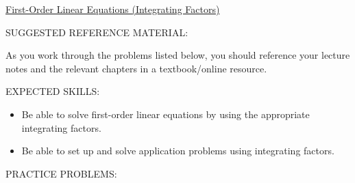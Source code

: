 \documentclass[12pt]{article}
\begin{document}
\begin{center}
\underline{\LARGE{First-Order Linear Equations (Integrating Factors)}}
\end{center}

\noindent SUGGESTED REFERENCE MATERIAL:

\medskip

\noindent As you work through the problems listed below, you should reference your lecture 
notes and the relevant chapters in a textbook/online resource.

\bigskip

\noindent EXPECTED SKILLS:

\medskip

\begin{itemize}[topsep=0pt]

\item Be able to solve first-order linear equations by using the appropriate integrating factors.

\item Be able to set up and solve application problems using integrating factors. 

\end{itemize}

\bigskip

\noindent PRACTICE PROBLEMS:

\medskip


\medskip
\end{document}
